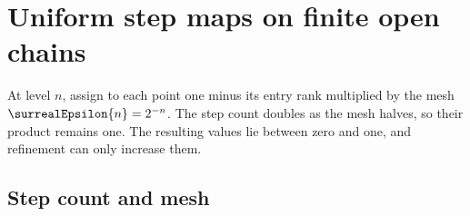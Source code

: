 \section{Uniform step maps on finite open chains}





At level $n$, assign to each point one minus its entry rank multiplied by
the mesh $\surrealEpsilon{n}=2^{-n}$. The step count doubles as the mesh
halves, so their product remains one. The resulting values lie between zero
and one, and refinement can only increase them.

\subsection{Step count and mesh}

